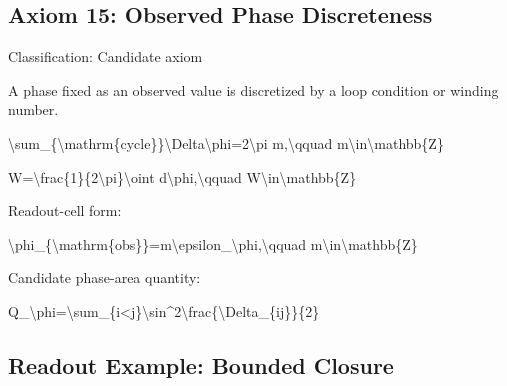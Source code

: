 \documentclass[
  a4paper,
]{article}
\newenvironment{Shaded}{}{}
\newcommand{\NormalTok}[1]{#1}
\begin{document}
\subsection{Axiom 15: Observed Phase
Discreteness}\label{axiom-15-observed-phase-discreteness}

Classification: Candidate axiom

A phase fixed as an observed value is discretized by a loop condition or
winding number.

\begin{Shaded}
\begin{Highlighting}[]
\NormalTok{\textbackslash{}sum\_\{\textbackslash{}mathrm\{cycle\}\}\textbackslash{}Delta\textbackslash{}phi=2\textbackslash{}pi m,\textbackslash{}qquad m\textbackslash{}in\textbackslash{}mathbb\{Z\}}
\end{Highlighting}
\end{Shaded}

\begin{Shaded}
\begin{Highlighting}[]
\NormalTok{W=\textbackslash{}frac\{1\}\{2\textbackslash{}pi\}\textbackslash{}oint d\textbackslash{}phi,\textbackslash{}qquad W\textbackslash{}in\textbackslash{}mathbb\{Z\}}
\end{Highlighting}
\end{Shaded}

Readout-cell form:

\begin{Shaded}
\begin{Highlighting}[]
\NormalTok{\textbackslash{}phi\_\{\textbackslash{}mathrm\{obs\}\}=m\textbackslash{}epsilon\_\textbackslash{}phi,\textbackslash{}qquad m\textbackslash{}in\textbackslash{}mathbb\{Z\}}
\end{Highlighting}
\end{Shaded}

Candidate phase-area quantity:

\begin{Shaded}
\begin{Highlighting}[]
\NormalTok{Q\_\textbackslash{}phi=\textbackslash{}sum\_\{i\textless{}j\}\textbackslash{}sin\^{}2\textbackslash{}frac\{\textbackslash{}Delta\_\{ij\}\}\{2\}}
\end{Highlighting}
\end{Shaded}

\subsection{Readout Example: Bounded
Closure}\label{readout-example-bounded-closure}
\end{document}

